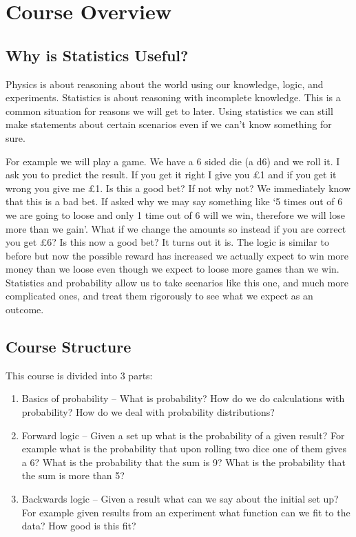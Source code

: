 
    \section{Course Overview}
    \subsection{Why is Statistics Useful?}
    Physics is about reasoning about the world using our knowledge, logic, and experiments.
    Statistics is about reasoning with incomplete knowledge.
    This is a common situation for reasons we will get to later.
    Using statistics we can still make statements about certain scenarios even if we can't know something for sure.
    
    For example we will play a game.
    We have a 6 sided die (a d6) and we roll it.
    I ask you to predict the result.
    If you get it right I give you \pounds1 and if you get it wrong you give me \pounds 1.
    Is this a good bet?
    If not why not?
    We immediately know that this is a bad bet.
    If asked why we may say something like `5 times out of 6 we are going to loose and only 1 time out of 6 will we win, therefore we will lose more than we gain'.
    What if we change the amounts so instead if you are correct you get \pounds6?
    Is this now a good bet?
    It turns out it is.
    The logic is similar to before but now the possible reward has increased we actually expect to win more money than we loose even though we expect to loose more games than we win.
    Statistics and probability allow us to take scenarios like this one, and much more complicated ones, and treat them rigorously to see what we expect as an outcome.
    
    \subsection{Course Structure}
    This course is divided into 3 parts:
    \begin{enumerate}[label=\Alph*.]
        \item Basics of probability -- What is probability?
        How do we do calculations with probability?
        How do we deal with probability distributions?
        
        \item Forward logic -- Given a set up what is the probability of a given result?
        For example what is the probability that upon rolling two dice one of them gives a 6?
        What is the probability that the sum is 9?
        What is the probability that the sum is more than 5?
        
        \item Backwards logic -- Given a result what can we say about the initial set up?
        For example given results from an experiment what function can we fit to the data?
        How good is this fit?
    \end{enumerate}
    
